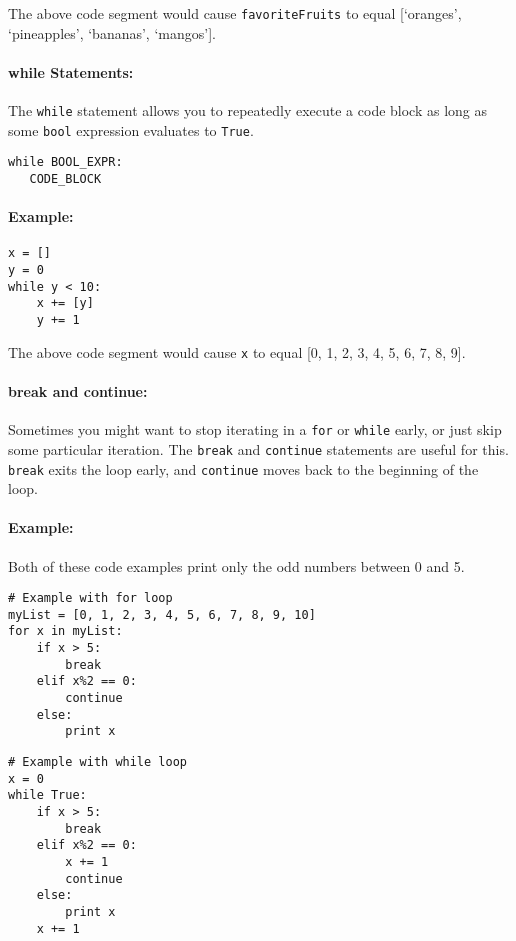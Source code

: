 \documentclass[11pt]{article}
\begin{document}
\noindent The above code segment would cause \texttt{favoriteFruits}
to equal [`oranges', `pineapples', `bananas', `mangos'].

\paragraph{\Large while Statements:}
The \texttt{while} statement allows you to repeatedly execute a code
block as long as some \texttt{bool} expression evaluates to
\texttt{True}.

\begin{verbatim}
while BOOL_EXPR:
   CODE_BLOCK
\end{verbatim}

\paragraph{Example:}
\begin{verbatim}
x = []
y = 0
while y < 10:
    x += [y]
    y += 1
\end{verbatim}

\noindent The above code segment would cause \texttt{x} to equal
[0, 1, 2, 3, 4, 5, 6, 7, 8, 9].

\paragraph{\Large break and continue:}

Sometimes you might want to stop iterating in a \texttt{for} or
\texttt{while} early, or just skip some particular iteration.  The
\texttt{break} and \texttt{continue} statements are useful for this.
\texttt{break} exits the loop early, and \texttt{continue} moves back
to the beginning of the loop.

\paragraph{Example:}

Both of these code examples print only the odd numbers between 0 and
5.

\begin{verbatim}
# Example with for loop
myList = [0, 1, 2, 3, 4, 5, 6, 7, 8, 9, 10]
for x in myList:
    if x > 5:
        break
    elif x%2 == 0:
        continue
    else:
        print x
\end{verbatim}

\begin{verbatim}
# Example with while loop
x = 0
while True:
    if x > 5:
        break
    elif x%2 == 0:
        x += 1
        continue
    else:
        print x
    x += 1
\end{verbatim}
\end{document}
